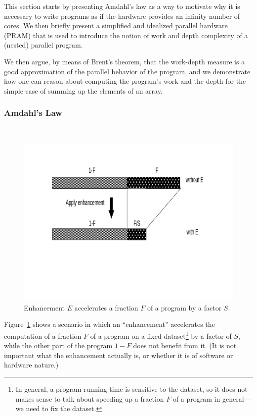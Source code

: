 \documentclass[acmsmall,review]{acmart}\settopmatter{printfolios=true,printccs=false,printacmref=false}
\begin{document}
This section starts by presenting Amdahl's law as a way to
motivate why it is necessary to write programs as if the
hardware provides an infinity number of cores. We then
briefly present a simplified and idealized parallel hardware 
(PRAM) that is used to introduce the notion of work and depth 
complexity of a (nested) parallel program. 

We then argue, by means of Brent's theorem, that the 
work-depth measure is a good approximation of the parallel 
behavior of the program, and we demonstrate how one can 
reason about computing the program's work and the depth 
for the simple case of summing up the elements of an array.

\subsubsection{Amdahl's Law}
\label{subsubsub:amdahl}
$\mbox{ }$\\

\begin{figure}
\vspace{-3ex}
\includegraphics[width=50ex]{Figures/L2/Amdahl}\vspace{-15ex}
\caption{Enhancement $E$ accelerates a fraction $F$ of a program by a factor $S$.}
\label{fig:amdahl-assump}
\end{figure} 

Figure~\ref{fig:amdahl-assump} shows a scenario in which
an ``enhancement'' accelerates the computation of a fraction
$F$ of a program on a fixed dataset\footnote{
In general, a program running time is sensitive to the dataset,
so it does not makes sense to talk about speeding up a fraction
$F$ of a program in general---we need to fix the dataset.
} by a factor of $S$, while the other part of the program 
$1-F$ does not benefit from it.
(It is not important what the enhancement actually is,
or whether it is of software or hardware nature.)
\end{document}

